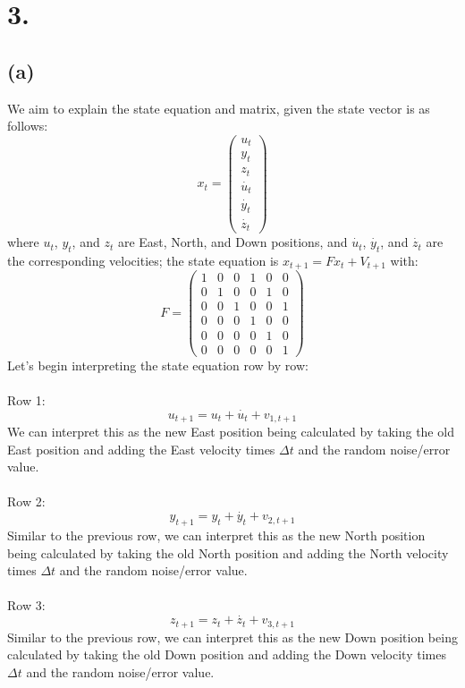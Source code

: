 \documentclass{article}
\begin{document}
{\Large 

\section*{3.}

\subsection*{(a)} 

We aim to explain the state equation and matrix, given the state vector is as follows:
\[
  x_t = \begin{pmatrix}
  u_t \\ y_t \\ z_t \\ \dot{u_t} \\ \dot{y_t} \\ \dot{z_t}
  \end{pmatrix}
\]
where \(u_t\), \(y_t\), and \(z_t\) are East, North, and Down positions, and
\(\dot{u_t}\), \(\dot{y_t}\), and \(\dot{z_t}\) are the corresponding velocities; the state equation is \(x_{t+1} = Fx_t + V_{t+1}\) with:
\[
  F = \begin{pmatrix}     
  1 & 0 & 0 & 1 & 0 & 0 \\
  0 & 1 & 0 & 0 & 1 & 0 \\
  0 & 0 & 1 & 0 & 0 & 1 \\
  0 & 0 & 0 & 1 & 0 & 0 \\
  0 & 0 & 0 & 0 & 1 & 0 \\
  0 & 0 & 0 & 0 & 0 & 1   
  \end{pmatrix}
\]
Let's begin interpreting the state equation row by row: \\ \\
Row 1:
\[
  u_{t+1} = u_t + \dot{u_t} + v_{1,t+1}
\]
We can interpret this as the new East position being calculated by taking the old East position and adding the East velocity times \(\Delta t\) and the random noise/error value. \\ \\ 
Row 2:
\[
  y_{t+1} = y_t + \dot{y_t} + v_{2,t+1}
\]
Similar to the previous row, we can interpret this as the new North position being calculated by taking the old North position and adding the North velocity times \(\Delta t\) and the random noise/error value. \\ \\ 
Row 3: 
\[
  z_{t+1} = z_t + \dot{z_t} + v_{3,t+1}
\]
Similar to the previous row, we can interpret this as the new Down position being calculated by taking the old Down position and adding the Down velocity times \(\Delta t\) and the random noise/error value. \\ \\
}
\end{document}
